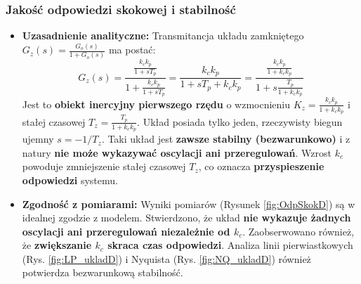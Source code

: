 \documentclass[12pt,a4paper]{article}
\begin{document}
	\subsubsection{Jakość odpowiedzi skokowej i stabilność}
	\begin{itemize}
		\item \textbf{Uzasadnienie analityczne:} Transmitancja układu zamkniętego $G_z(s) = \frac{G_o(s)}{1 + G_o(s)}$ ma postać:
		\[
		G_z(s) = \frac{\frac{k_c k_p}{1 + sT_p}}{1 + \frac{k_c k_p}{1 + sT_p}} = \frac{k_c k_p}{1 + sT_p + k_c k_p} = \frac{\frac{k_c k_p}{1 + k_c k_p}}{1 + s \frac{T_p}{1 + k_c k_p}}
		\]
		Jest to \textbf{obiekt inercyjny pierwszego rzędu} o wzmocnieniu $K_z = \frac{k_c k_p}{1 + k_c k_p}$ i stałej czasowej $T_z = \frac{T_p}{1 + k_c k_p}$. Układ posiada tylko jeden, rzeczywisty biegun ujemny $s = -1/T_z$. Taki układ jest \textbf{zawsze stabilny (bezwarunkowo)} i z natury \textbf{nie może wykazywać oscylacji ani przeregulowań}. Wzrost $k_c$ powoduje zmniejszenie stałej czasowej $T_z$, co oznacza \textbf{przyspieszenie odpowiedzi} systemu.
		
		\item \textbf{Zgodność z pomiarami:} Wyniki pomiarów (Rysunek \ref{fig:OdpSkokD}) są w idealnej zgodzie z modelem. Stwierdzono, że układ \textbf{nie wykazuje żadnych oscylacji ani przeregulowań niezależnie od $k_c$}. Zaobserwowano również, że \textbf{zwiększanie $k_c$ skraca czas odpowiedzi}. Analiza linii pierwiastkowych (Rys. \ref{fig:LP_ukladD}) i Nyquista (Rys. \ref{fig:NQ_ukladD}) również potwierdza bezwarunkową stabilność.
	\end{itemize}
	
\end{document}
